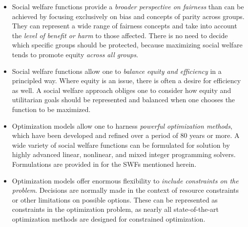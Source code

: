 \documentclass{article}[11pt]
\begin{document}
\begin{itemize}
\item Social welfare functions provide a {\em broader perspective on fairness} than can be achieved by focusing exclusively on bias and concepts of parity across groups.  They can represent a wide range of fairness concepts and take into account the {\em level of benefit or harm} to those affected.  There is no need to decide which specific groups should be protected, because maximizing social welfare tends to promote equity {\em across all groups}.  

\item Social welfare functions allow one to {\em balance equity and efficiency} in a principled way.  Where equity is an issue, there is often  a desire for efficiency as well.  A social welfare approach obliges one to consider how equity and utilitarian goals should be represented and balanced when one chooses the function to be maximized.  

\item Optimization models allow one to harness {\em powerful optimization methods}, which have been developed and refined over a period of 80 years or more.  A wide variety of social welfare functions can be formulated for solution by highly advanced linear, nonlinear, and mixed integer programming solvers.  Formulations are provided in \cite{CheHoo22} for the SWFs mentioned herein.

\item Optimization models offer enormous flexibility to {\em include constraints on the problem}. Decisions are normally made in the context of resource constraints or other limitations on possible options.  These can be represented as constraints in the optimization problem, as nearly all state-of-the-art optimization methods are designed for constrained optimization.  

\end{itemize}
\end{document}
